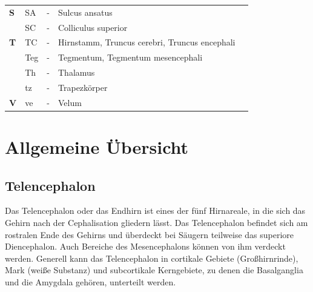 \documentclass[12pt,a4paper,pdftex]{article}
\begin{document}
\begin{table}[H]
\begin{tabular}{llcll}
\textbf{S} & SA  & -          & Sulcus ansatus                                                          &                               \\
\textbf{}  & SC  & -          & Colliculus superior                                                     &                               \\
\textbf{T} & TC  & -          & Hirnstamm, Truncus cerebri, Truncus encephali &                               \\
\textbf{}  & Teg & -          & Tegmentum, Tegmentum mesencephali           &                               \\
\textbf{}  & Th  & -          & Thalamus                                                                &                               \\
\textbf{}  & tz  & -          & Trapezkörper                                                            &                               \\
\textbf{V} & ve  & -          & Velum                                                                   &                              
\end{tabular}
\end{table}

\newpage
\section{Allgemeine Übersicht}

\subsection{Telencephalon}
\label{subsec:Telencephalon} 

Das Telencephalon oder das Endhirn ist eines der fünf Hirnareale, in die sich das Gehirn nach der Cephalisation gliedern lässt. Das Telencephalon befindet sich am rostralen Ende des Gehirns und überdeckt bei Säugern teilweise das superiore Diencephalon. Auch Bereiche des Mesencephalons können von ihm verdeckt werden. Generell kann das Telencephalon in cortikale Gebiete (Großhirnrinde), Mark (weiße Substanz) und subcortikale Kerngebiete, zu denen die Basalganglia und die Amygdala gehören, unterteilt werden. 
\end{document}
